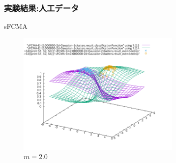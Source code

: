\documentclass[13pt,dvipdfmx]{beamer}
\begin{document}
\begin{frame}\frametitle{実験結果:人工データ}
  \begin{block}{sFCMA}
   \begin{figure}[htbp]
    \begin{center}
    \includegraphics[height=60mm]{sFCMA-Em2.png}
   \end{center}
    \captionsetup{labelformat=empty,labelsep=none}
   \caption{$m=2.0$}
  \end{figure}
 \end{block}
\end{frame}
\end{document}
